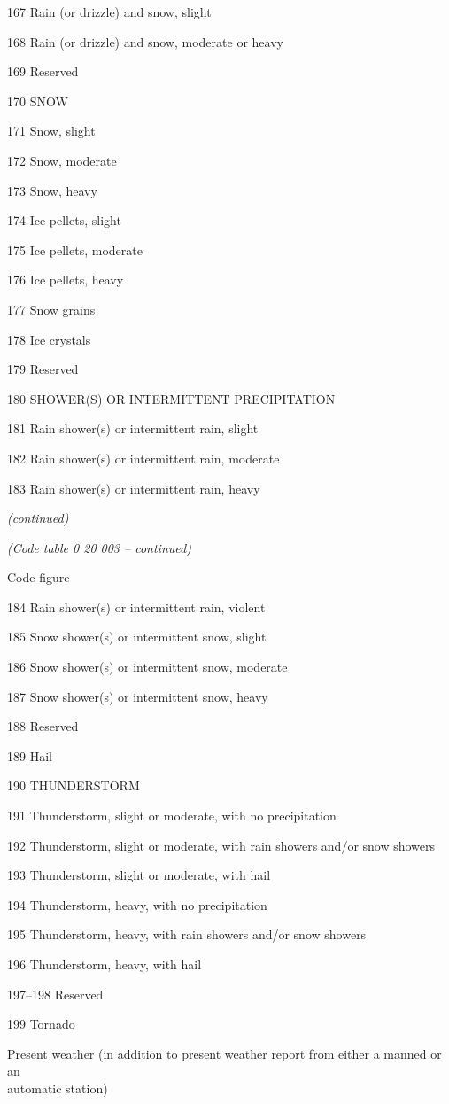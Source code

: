 167 Rain (or drizzle) and snow, slight

168 Rain (or drizzle) and snow, moderate or heavy

169 Reserved

170 SNOW

171 Snow, slight

172 Snow, moderate

173 Snow, heavy

174 Ice pellets, slight

175 Ice pellets, moderate

176 Ice pellets, heavy

177 Snow grains

178 Ice crystals

179 Reserved

180 SHOWER(S) OR INTERMITTENT PRECIPITATION

181 Rain shower(s) or intermittent rain, slight

182 Rain shower(s) or intermittent rain, moderate

183 Rain shower(s) or intermittent rain, heavy

\emph{(continued)}

\emph{(Code table 0 20 003 -- continued)}

Code figure

184 Rain shower(s) or intermittent rain, violent

185 Snow shower(s) or intermittent snow, slight

186 Snow shower(s) or intermittent snow, moderate

187 Snow shower(s) or intermittent snow, heavy

188 Reserved

189 Hail

190 THUNDERSTORM

191 Thunderstorm, slight or moderate, with no precipitation

192 Thunderstorm, slight or moderate, with rain showers and/or snow showers

193 Thunderstorm, slight or moderate, with hail

194 Thunderstorm, heavy, with no precipitation

195 Thunderstorm, heavy, with rain showers and/or snow showers

196 Thunderstorm, heavy, with hail

197--198 Reserved

199 Tornado

Present weather (in addition to present weather report from either a manned or an\\
automatic station)

